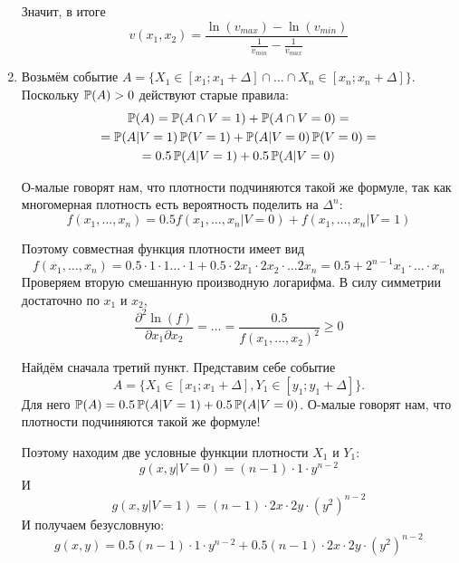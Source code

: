 \begin{enumerate}
Значит, в итоге
\begin{equation}
v(x_{1},x_{2})=\frac{\ln(v_{max})-\ln(v_{min})}{\frac{1}{v_{min}}-\frac{1}{v_{max}}}
\end{equation}

\item Возьмём событие $ A=\{X_{1}\in[x_{1};x_{1}+\Delta] \cap \ldots \cap X_{n}\in[x_{n};x_{n}+\Delta]\} $. Поскольку $ \P(A)>0 $ действуют старые правила:
\begin{multline}
\P(A)=\P(A\cap V=1)+\P(A\cap V=0)=\\
=\P(A|V=1)\P(V=1)+\P(A|V=0)\P(V=0)=\\
=0.5\P(A|V=1)+0.5\P(A|V=0)
\end{multline}

О-малые говорят нам, что плотности подчиняются такой же формуле, так как многомерная плотность есть вероятность поделить на $ \Delta^{n} $:
\begin{equation}
f(x_{1},\ldots,x_{n})=0.5f(x_{1},\ldots,x_{n}|V=0)+f(x_{1},\ldots,x_{n}|V=1)
\end{equation}

Поэтому совместная функция плотности имеет вид
\begin{equation}
f(x_{1},\ldots,x_{n})=0.5\cdot 1\cdot 1 \ldots\cdot 1+0.5\cdot 2x_{1}\cdot 2x_{2}\cdot \ldots 2x_{n}=0.5+2^{n-1}x_{1}\cdot \ldots \cdot x_{n}
\end{equation}
Проверяем вторую смешанную производную логарифма. В силу симметрии достаточно по $ x_{1} $ и $ x_{2} $,
\begin{equation}
\frac{\partial^{2}\ln(f)}{\partial x_{1}\partial x_{2}}=\ldots=\frac{0.5}{f(x_{1},\ldots,x_{2})^{2}}\geq 0
\end{equation}


Найдём сначала третий пункт. Представим себе событие
\[
A=\{X_{1}\in [x_{1};x_{1}+\Delta], Y_{1}\in[y_{1};y_{1}+\Delta]\}.
\]
Для него $ \P(A)= 0.5\P(A|V=1)+0.5\P(A|V=0)$. О-малые говорят нам, что плотности подчиняются такой же формуле!

Поэтому находим две условные функции плотности $ X_{1} $ и $ Y_{1} $:
\begin{equation}
g(x,y|V=0)=(n-1)\cdot 1 \cdot y^{n-2}
\end{equation}
И
\begin{equation}
g(x,y|V=1)=(n-1)\cdot 2x \cdot 2y \cdot (y^{2})^{n-2}
\end{equation}
И получаем безусловную:
\begin{equation}
g(x,y)=0.5(n-1)\cdot 1 \cdot y^{n-2}+0.5(n-1)\cdot 2x \cdot 2y \cdot (y^{2})^{n-2}
\end{equation}


\end{enumerate}
